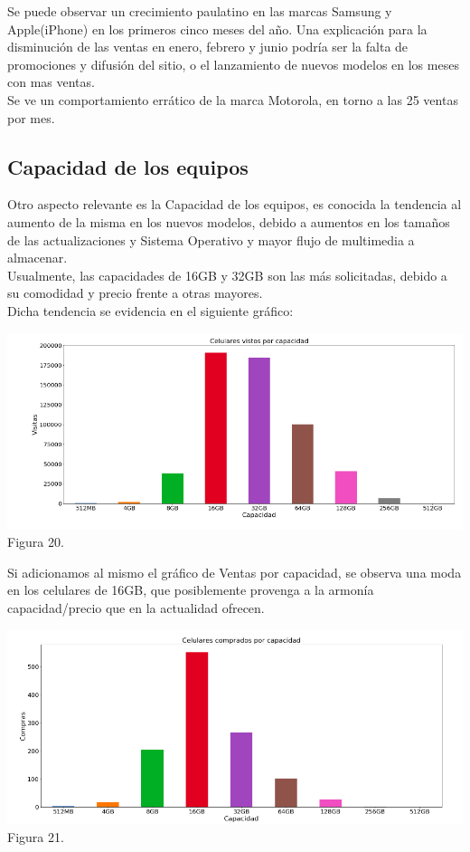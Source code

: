 \documentclass[a4paper ,12pt]{article}
\begin{document}
Se puede observar un crecimiento paulatino en las marcas Samsung y Apple(iPhone) en los primeros cinco meses del año. Una explicación para la disminución de las ventas en enero, febrero y junio podría ser la falta de promociones y difusión del sitio, o el lanzamiento de nuevos modelos en los meses con mas ventas.\\


Se ve un comportamiento errático de la marca Motorola, en torno a las 25 ventas por mes.\\

\subsection{Capacidad de los equipos}
Otro aspecto relevante es la Capacidad de los equipos, es conocida la tendencia al aumento de la misma en los nuevos modelos, debido a aumentos en los tamaños de las actualizaciones y Sistema Operativo y mayor flujo de multimedia a almacenar.\\


Usualmente, las capacidades de 16GB y 32GB son las más solicitadas, debido a su comodidad y precio frente a otras mayores.\\

\newpage
Dicha tendencia se evidencia en el siguiente gráfico:

\begin{center}
	\includegraphics[width=1.1\linewidth]{output_69_1}
	Figura 20.
	
\end{center}

Si adicionamos al mismo el gráfico de Ventas por capacidad, se observa una moda en los celulares de 16GB, que posiblemente provenga a la armonía capacidad/precio que en la actualidad ofrecen.
\\

\begin{center}
	\includegraphics[width=1.2\linewidth]{output_70_1}
	Figura 21.
	
\end{center}
\end{document}
